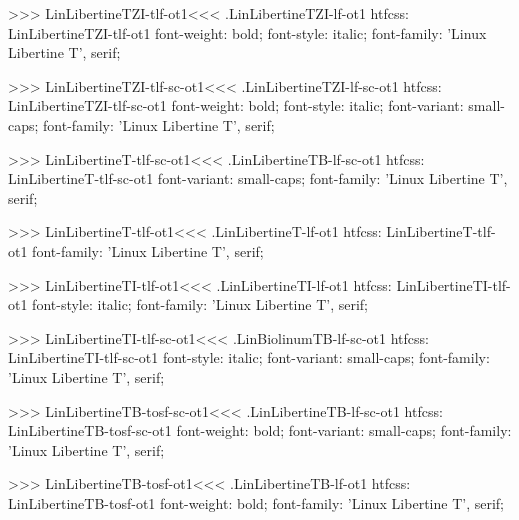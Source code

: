 {{{{{{{>>>
\<LinLibertineTZI-tlf-ot1\><<<
.LinLibertineTZI-lf-ot1
htfcss:  LinLibertineTZI-tlf-ot1  font-weight: bold; font-style: italic; font-family: 'Linux Libertine T', serif;

>>>
\<LinLibertineTZI-tlf-sc-ot1\><<<
.LinLibertineTZI-lf-sc-ot1
htfcss:  LinLibertineTZI-tlf-sc-ot1  font-weight: bold; font-style: italic; font-variant: small-caps; font-family: 'Linux Libertine T', serif;

>>>
\<LinLibertineT-tlf-sc-ot1\><<<
.LinLibertineTB-lf-sc-ot1
htfcss:  LinLibertineT-tlf-sc-ot1  font-variant: small-caps; font-family: 'Linux Libertine T', serif;

>>>
\<LinLibertineT-tlf-ot1\><<<
.LinLibertineT-lf-ot1
htfcss:  LinLibertineT-tlf-ot1  font-family: 'Linux Libertine T', serif;

>>>
\<LinLibertineTI-tlf-ot1\><<<
.LinLibertineTI-lf-ot1
htfcss:  LinLibertineTI-tlf-ot1  font-style: italic; font-family: 'Linux Libertine T', serif;

>>>
\<LinLibertineTI-tlf-sc-ot1\><<<
.LinBiolinumTB-lf-sc-ot1
htfcss:  LinLibertineTI-tlf-sc-ot1  font-style: italic; font-variant: small-caps; font-family: 'Linux Libertine T', serif;

>>>
\<LinLibertineTB-tosf-sc-ot1\><<<
.LinLibertineTB-lf-sc-ot1
htfcss:  LinLibertineTB-tosf-sc-ot1  font-weight: bold; font-variant: small-caps; font-family: 'Linux Libertine T', serif;

>>>
\<LinLibertineTB-tosf-ot1\><<<
.LinLibertineTB-lf-ot1
htfcss:  LinLibertineTB-tosf-ot1  font-weight: bold; font-family: 'Linux Libertine T', serif;

}}}}}}}
